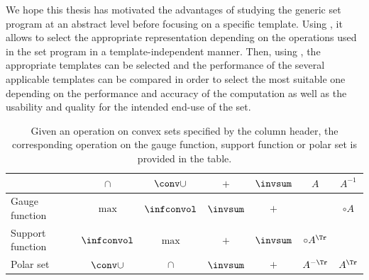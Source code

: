 \documentclass[11pt,twoside,a4paper,openright]{uclouvain-thesis}
\begin{document}
We hope this thesis has motivated the advantages of studying the generic set program at an abstract
level before focusing on a specific template.
Using , it allows to select the appropriate representation depending on the operations used in the set program in a template-independent manner.
Then, using , the appropriate templates can be selected and the performance of the several applicable templates
can be compared in order to select the most suitable one depending on the performance and accuracy of the computation
as well as the usability and quality for the intended end-use of the set.

\begin{table}[!ht]
  \centering
  \begin{tabular}{l|cccccc}
                         & $\cap$       & $\conv \cup$ &  $+$      & $\invsum$ &  $A$          & $A^{-1}$\\
    \hline
    Gauge function       & $\max$       & $\infconvol$ & $\invsum$ & $+$       &               & $\circ A$\\
    Support function     & $\infconvol$ & $\max$       & $+$       & $\invsum$ & $\circ A^\Tr$ &          \\
    Polar set            & $\conv \cup$ & $\cap$       & $\invsum$ & $+$       & $A^{-\Tr}$    & $A^{\Tr}$\\
  \end{tabular}
  \caption{Given an operation on convex sets specified by the column header,
  the corresponding operation on the gauge function, support function or polar set is provided in the table.%
  }
  \label{tab:funop}
\end{table}
\end{document}
